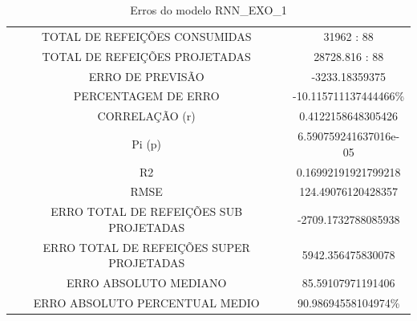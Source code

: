                 \begin{table}[!ht]
                \centering
                \caption{Erros do modelo  RNN\_EXO\_1 }
                    \begin{tabular}{|c|c|}
                    \rowcolor{gray!50}
                    \hline
                \multicolumn{2}{c}{RNN\_EXO\_1:} \\
                \hline
                TOTAL DE REFEIÇÕES CONSUMIDAS & 31962 : 88  \\
                TOTAL DE REFEIÇÕES PROJETADAS & 28728.816 : 88  \\
                ERRO DE PREVISÃO & -3233.18359375 \\
                PERCENTAGEM DE ERRO & -10.115711137444466\%  \\
                CORRELAÇÃO (r) & 0.4122158648305426 \\ Pi (p) & 6.590759241637016e-05\\ R2 & 0.16992191921799218\\
                RMSE & 124.49076120428357\\
                ERRO TOTAL DE REFEIÇÕES SUB PROJETADAS & -2709.1732788085938\\
                ERRO TOTAL DE REFEIÇÕES SUPER PROJETADAS & 5942.356475830078\\
                ERRO ABSOLUTO MEDIANO & 85.59107971191406\\
                ERRO ABSOLUTO PERCENTUAL MEDIO & 90.98694558104974\% \\ \hline \end{tabular} \end{table}
                
